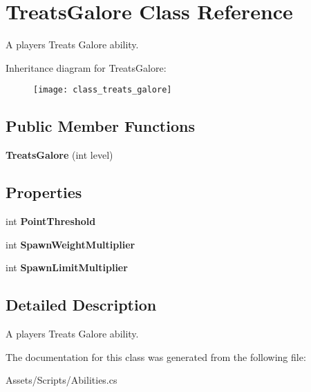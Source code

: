 \hypertarget{class_treats_galore}{}\section{Treats\+Galore Class Reference}
\label{class_treats_galore}


A player\textquotesingle{}s Treats Galore ability.  


Inheritance diagram for Treats\+Galore\+:\begin{figure}[H]
\begin{center}
\leavevmode
\texttt{[image: class\_treats\_galore]}
\end{center}
\end{figure}
\subsection*{Public Member Functions}
\begin{DoxyCompactItemize}
\item 
{\bfseries Treats\+Galore} (int level)\hypertarget{class_treats_galore_ab9946890bea321ef15fa0d5116d1ce72}{}\label{class_treats_galore_ab9946890bea321ef15fa0d5116d1ce72}

\end{DoxyCompactItemize}
\subsection*{Properties}
\begin{DoxyCompactItemize}
\item 
int {\bfseries Point\+Threshold}\hypertarget{class_treats_galore_a6306c19dd728607ada172be9666a7da3}{}\label{class_treats_galore_a6306c19dd728607ada172be9666a7da3}

\item 
int {\bfseries Spawn\+Weight\+Multiplier}\hypertarget{class_treats_galore_a8d9b5ef547e7eafc44eded4ebbb558b1}{}\label{class_treats_galore_a8d9b5ef547e7eafc44eded4ebbb558b1}

\item 
int {\bfseries Spawn\+Limit\+Multiplier}\hypertarget{class_treats_galore_ac98fd56615afcf831c8693019e2a3868}{}\label{class_treats_galore_ac98fd56615afcf831c8693019e2a3868}

\end{DoxyCompactItemize}


\subsection{Detailed Description}
A player\textquotesingle{}s Treats Galore ability. 



The documentation for this class was generated from the following file\+:\begin{DoxyCompactItemize}
\item 
Assets/\+Scripts/Abilities.\+cs\end{DoxyCompactItemize}
